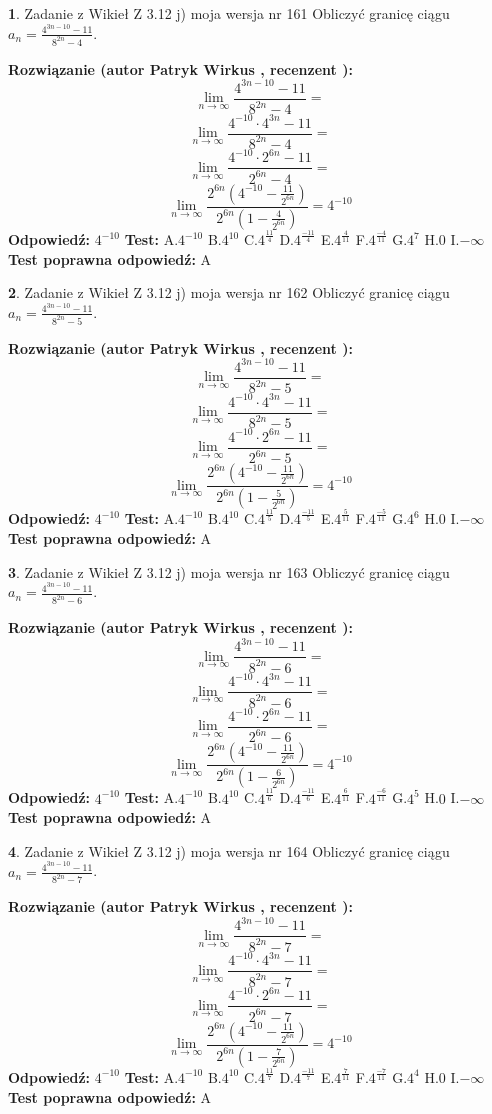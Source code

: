 \documentclass[12pt, a4paper]{article}
\theoremstyle{definition} %
\newtheorem{zad}{}
\newcommand{\zadStart}[1]{\begin{zad}#1\newline}
\newcommand{\zadStop}{\end{zad}}
\newcommand{\rozwStart}[2]{\noindent \textbf{Rozwiązanie (autor #1 , recenzent #2): }\newline}
\newcommand{\rozwStop}{\newline}
\newcommand{\odpStart}{\noindent \textbf{Odpowiedź:}\newline}
\newcommand{\odpStop}{\newline}
\newcommand{\testStart}{\noindent \textbf{Test:}\newline}
\newcommand{\testStop}{\newline}
\newcommand{\kluczStart}{\noindent \textbf{Test poprawna odpowiedź:}\newline}
\newcommand{\kluczStop}{\newline}
\begin{document}
\zadStart{Zadanie z Wikieł Z 3.12 j) moja wersja nr 161}
Obliczyć granicę ciągu $a_{n}=\frac{4^{3n-10}-11}{8^{2n}-4}$.
\zadStop
\rozwStart{Patryk Wirkus}{}
$$\lim\limits_{n\to\infty}\frac{4^{3n-10}-11}{8^{2n}-4}=$$
$$\lim\limits_{n\to\infty}\frac{4^{-10} \cdot 4^{3n}-11}{8^{2n}-4}=$$
$$\lim\limits_{n\to\infty}\frac{4^{-10} \cdot 2^{6n}-11}{2^{6n}-4}=$$
$$\lim\limits_{n\to\infty}\frac{2^{6n}(4^{-10} - \frac{11}{2^{6n}})}{2^{6n}(1-\frac{4}{2^{6n}})}= 4^{-10}$$
\rozwStop
\odpStart
$4^{-10}$
\odpStop
\testStart
A.$4^{-10}$
B.$4^{10}$
C.$4^{\frac{11}{4}}$
D.$4^{\frac{-11}{4}}$
E.$4^{\frac{4}{11}}$
F.$4^{\frac{-4}{11}}$
G.$4^{7}$
H.$0$
I.$-\infty$
\testStop
\kluczStart
A
\kluczStop



\zadStart{Zadanie z Wikieł Z 3.12 j) moja wersja nr 162}
Obliczyć granicę ciągu $a_{n}=\frac{4^{3n-10}-11}{8^{2n}-5}$.
\zadStop
\rozwStart{Patryk Wirkus}{}
$$\lim\limits_{n\to\infty}\frac{4^{3n-10}-11}{8^{2n}-5}=$$
$$\lim\limits_{n\to\infty}\frac{4^{-10} \cdot 4^{3n}-11}{8^{2n}-5}=$$
$$\lim\limits_{n\to\infty}\frac{4^{-10} \cdot 2^{6n}-11}{2^{6n}-5}=$$
$$\lim\limits_{n\to\infty}\frac{2^{6n}(4^{-10} - \frac{11}{2^{6n}})}{2^{6n}(1-\frac{5}{2^{6n}})}= 4^{-10}$$
\rozwStop
\odpStart
$4^{-10}$
\odpStop
\testStart
A.$4^{-10}$
B.$4^{10}$
C.$4^{\frac{11}{5}}$
D.$4^{\frac{-11}{5}}$
E.$4^{\frac{5}{11}}$
F.$4^{\frac{-5}{11}}$
G.$4^{6}$
H.$0$
I.$-\infty$
\testStop
\kluczStart
A
\kluczStop



\zadStart{Zadanie z Wikieł Z 3.12 j) moja wersja nr 163}
Obliczyć granicę ciągu $a_{n}=\frac{4^{3n-10}-11}{8^{2n}-6}$.
\zadStop
\rozwStart{Patryk Wirkus}{}
$$\lim\limits_{n\to\infty}\frac{4^{3n-10}-11}{8^{2n}-6}=$$
$$\lim\limits_{n\to\infty}\frac{4^{-10} \cdot 4^{3n}-11}{8^{2n}-6}=$$
$$\lim\limits_{n\to\infty}\frac{4^{-10} \cdot 2^{6n}-11}{2^{6n}-6}=$$
$$\lim\limits_{n\to\infty}\frac{2^{6n}(4^{-10} - \frac{11}{2^{6n}})}{2^{6n}(1-\frac{6}{2^{6n}})}= 4^{-10}$$
\rozwStop
\odpStart
$4^{-10}$
\odpStop
\testStart
A.$4^{-10}$
B.$4^{10}$
C.$4^{\frac{11}{6}}$
D.$4^{\frac{-11}{6}}$
E.$4^{\frac{6}{11}}$
F.$4^{\frac{-6}{11}}$
G.$4^{5}$
H.$0$
I.$-\infty$
\testStop
\kluczStart
A
\kluczStop



\zadStart{Zadanie z Wikieł Z 3.12 j) moja wersja nr 164}
Obliczyć granicę ciągu $a_{n}=\frac{4^{3n-10}-11}{8^{2n}-7}$.
\zadStop
\rozwStart{Patryk Wirkus}{}
$$\lim\limits_{n\to\infty}\frac{4^{3n-10}-11}{8^{2n}-7}=$$
$$\lim\limits_{n\to\infty}\frac{4^{-10} \cdot 4^{3n}-11}{8^{2n}-7}=$$
$$\lim\limits_{n\to\infty}\frac{4^{-10} \cdot 2^{6n}-11}{2^{6n}-7}=$$
$$\lim\limits_{n\to\infty}\frac{2^{6n}(4^{-10} - \frac{11}{2^{6n}})}{2^{6n}(1-\frac{7}{2^{6n}})}= 4^{-10}$$
\rozwStop
\odpStart
$4^{-10}$
\odpStop
\testStart
A.$4^{-10}$
B.$4^{10}$
C.$4^{\frac{11}{7}}$
D.$4^{\frac{-11}{7}}$
E.$4^{\frac{7}{11}}$
F.$4^{\frac{-7}{11}}$
G.$4^{4}$
H.$0$
I.$-\infty$
\testStop
\kluczStart
A
\kluczStop
\end{document}
